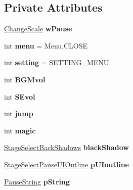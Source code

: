 \subsection*{Private Attributes}
\begin{DoxyCompactItemize}
\item 
\mbox{\label{class_pause_a1ef15392c52442f736b7f40cfaea627e}} 
\hyperlink{class_change_scale}{Change\+Scale} {\bfseries w\+Pause}
\item 
\mbox{\label{class_pause_a4264fdd5b4d4b5c6daa6c1b384390082}} 
int {\bfseries menu} = Menu.\+C\+L\+O\+SE
\item 
\mbox{\label{class_pause_a24599a3a40516580d486e13d506e0368}} 
int {\bfseries setting} = S\+E\+T\+T\+I\+N\+G\+\_\+\+M\+E\+NU
\item 
\mbox{\label{class_pause_a904e6a431d28b76af9592875ddf4fce7}} 
int {\bfseries B\+G\+Mvol}
\item 
\mbox{\label{class_pause_a5e7dd9a07c8fe5dd7f65bb807e94f39a}} 
int {\bfseries S\+Evol}
\item 
\mbox{\label{class_pause_a36269a84092d52f119fc0253775c59c0}} 
int {\bfseries jump}
\item 
\mbox{\label{class_pause_adf36bc8fef636a5831f3f5ade4ad8c60}} 
int {\bfseries magic}
\item 
\mbox{\label{class_pause_a19f62c88a1046fc6f8502cd661e3a023}} 
\hyperlink{class_stage_select_back_shadows}{Stage\+Select\+Back\+Shadows} {\bfseries black\+Shadow}
\item 
\mbox{\label{class_pause_ad647209de39987b39ee7e20ac6692050}} 
\hyperlink{class_stage_select_pause_u_i_outline}{Stage\+Select\+Pause\+U\+I\+Outline} {\bfseries p\+U\+Ioutline}
\item 
\mbox{\label{class_pause_aeaf4fde4bb869683f1a72985ba44347f}} 
\hyperlink{class_pause_string}{Pause\+String} {\bfseries p\+String}
\item 
\mbox{\label{class_pause_a0bf2516602e942bc4fdc938df558c8a9}} 

\end{DoxyCompactItemize}
